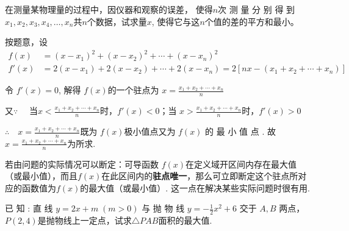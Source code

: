 \begin{example}
    在测量某物理量的过程中，因仪器和观察的误差， 使得$n$次 测 量 分 别 得 到$x_1, x_2, x_3, x_4,\ldots , x_n$共$n$个数据，试求量$x$, 使得它与这$n$个值的差的平方和最小。
\end{example}

\begin{solution}
按题意，设
\[\begin{split}
    f(x)&=(x-x_{1})^{2}+(x-x_{2})^{2}+\cdots+(x-x_{n})^{2}\\
   f'(x)&=2(x-x_{1})+2(x-x_{2})+\cdots+2(x-x_{n})=2[nx-(x_{1}+x_{2}+\cdots+x_{n})]
\end{split}\]

令 $f'(x)=0$, 解得 $f(x)$的一个驻点为
$x=\frac{x_{1}+x_{2}+\cdots+x_{n}}{n}$

又$\because\quad$ 当$x< \frac {x_{1}+ x_{2}+ \cdots + x_{n}}n$时，$f'(x)<0$；当
$x>\frac{x_1+x_2+\cdots+x_n}n$时，$f'(x)>0$

$\therefore\quad x= \frac {x_{1}+ x_{2}+ \cdots + x_{n}}n$既为 $f(x)$极小值点又为 $f(x)$
的 最 小 值 点 . 故  $x= \frac {x_{1}+ x_{2}+ \cdots + x_{n}}n$为所求.
  \end{solution}

\begin{rmk}
    若由问题的实际情况可以断定：可导函数 $f(x)$在定义域开区间内存在最大值（或最小值），而且$f(x)$在此区间内的\textbf{驻点唯一}，那么可立即断定这个驻点所对应的函数值为$f(x)$的最大值（或最小值）. 这一点在解决某些实际问题时很有用.
\end{rmk}

\begin{example}
已 知 : 直 线 $y= 2x+ m\; ( m> 0)$ 与 抛 物 线 $y= - \frac 12x^{2} +6$ 交于 $A,B$ 两点， $P(2,4)$是抛物线上一定点，试求$\triangle PAB$面积的最大值.
\end{example}

